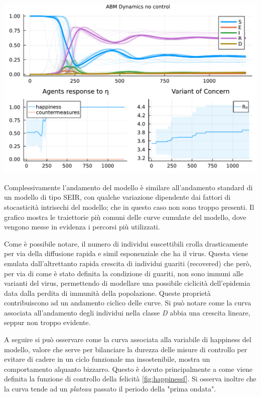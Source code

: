 \begin{minipage}{\linewidth}
	\centering
	\includegraphics[width=\textwidth]{img/SocialNetworkABM_NO_CONTROL.pdf}
	\label{fig:abm_no_intervent}
\end{minipage}

Complessivamente l'andamento del modello è similare all'andamento standard di un modello di tipo  
SEIR, con qualche variazione dipendente dai fattori di stocasticità intrisechi del modello; che in questo
caso non sono troppo presenti. Il grafico mostra le traiettorie più comuni delle curve cumulate del modello, 
dove vengono messe in evidenza i percorsi più utilizzati. 

Come è possibile notare, il numero di individui suscettibili crolla drasticamente
per via della diffusione rapida e simil esponenziale che ha il virus. Questa viene emulata
dall'altrettanto rapida crescita di individui guariti (recovered) che però, per via
di come è stato definita la condizione di guariti, non sono immuni alle varianti del virus, permettendo 
di modellare una possibile ciclicità dell'epidemia data dalla perdita di immunità della popolazione. 
Queste proprietà contribuiscono ad un andamento ciclico delle curve. Si può notare come 
la curva associata all'andamento degli individui nella classe \emph{D} abbia una crescita lineare, 
seppur non troppo evidente.

A seguire si può osservare come la curva associata alla variabile di happiness del modello,
valore che serve per bilanciare la durezza delle misure di controllo per evitare 
di cadere in un ciclo funzionale ma insostenibile, mostra un comportamento alquanto bizzarro.
Questo è dovuto principalmente a come viene definita la funzione di controllo della felicità \ref{fig:happinessf}.
Si osserva inoltre che la curva tende ad un \emph{plateau} passato il periodo della "prima ondata".

